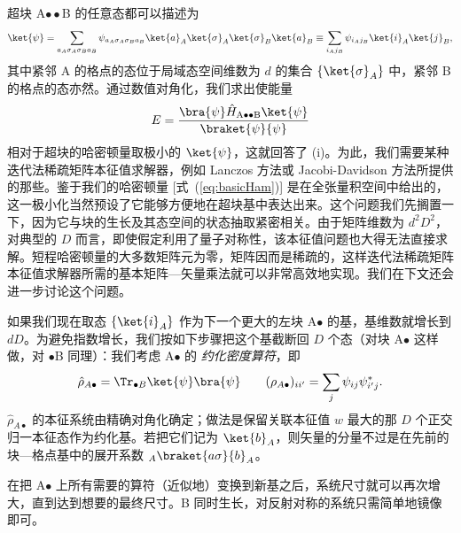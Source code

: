 超块 A$\bullet\bullet$B 的任意态都可以描述为
\begin{equation}
\ket{\psi}= \sum_{a_A \sigma_A \sigma_B a_B} \psi_{a_A \sigma_A \sigma_B a_B} \ket{a}_A \ket{\sigma}_A \ket{\sigma}_B \ket{a}_B \equiv \sum_{i_A j_B} \psi_{i_A j_B} \ket{i}_A \ket{j}_B,
\label{US:eq:DMRGstate}
\end{equation}
其中紧邻 A 的格点的态位于局域态空间维数为 $d$ 的集合 $\{ \ket{\sigma}_A \}$ 中，紧邻 B 的格点的态亦然。通过数值对角化，我们求出使能量
\begin{equation}
E = \frac{\bra{\psi} \hat{H}_{{\rm A}\bullet\bullet{\rm B}} \ket{\psi}}{\braket{\psi}{\psi}}
\end{equation}
相对于超块的哈密顿量取极小的 $\ket{\psi}$，这就回答了 (i)。为此，我们需要某种迭代法稀疏矩阵本征值求解器，例如 Lanczos 方法或 Jacobi-Davidson 方法所提供的那些。鉴于我们的哈密顿量 [式~(\ref{eq:basicHam})] 是在全张量积空间中给出的，这一极小化当然预设了它能够方便地在超块基中表达出来。这个问题我们先搁置一下，因为它与块的生长及其态空间的状态抽取紧密相关。由于矩阵维数为 $d^2 D^2$，对典型的 $D$ 而言，即使假定利用了量子对称性，该本征值问题也大得无法直接求解。短程哈密顿量的大多数矩阵元为零，矩阵因而是稀疏的，这样迭代法稀疏矩阵本征值求解器所需的基本矩阵—矢量乘法就可以非常高效地实现。我们在下文还会进一步讨论这个问题。

如果我们现在取态 $\{ \ket{i}_A \}$ 作为下一个更大的左块 A$\bullet$ 的基，基维数就增长到 $dD$。为避免指数增长，我们按如下步骤把这个基截断回 $D$ 个态（对块 A$\bullet$ 这样做，对 $\bullet$B 同理）：我们考虑 A$\bullet$ 的 {\em 约化密度算符}，即
\begin{equation}
\hat{\rho}_{A\bullet} = \Tr_{\bullet B} \ket{\psi}\bra{\psi} 	\quad\quad (\rho_{A\bullet})_{ii'} = \sum_j \psi_{ij}\psi^*_{i'j} .
\end{equation}
$\hat{\rho}_{A\bullet}$ 的本征系统由精确对角化确定；做法是保留关联本征值 $w$ 最大的那 $D$ 个正交归一本征态作为约化基。若把它们记为 $\ket{b}_A$，则矢量的分量不过是在先前的块—格点基中的展开系数 $_A \braket{a \sigma}{b}_A$。

在把 A$\bullet$ 上所有需要的算符（近似地）变换到新基之后，系统尺寸就可以再次增大，直到达到想要的最终尺寸。B 同时生长，对反射对称的系统只需简单地镜像即可。

